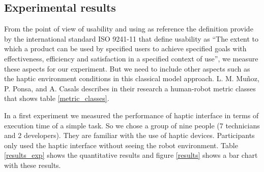 \documentclass[journal,twoside]{JoPhA}
\begin{document}
\subsection{Experimental results}

From the point of view of usability and using as reference the definition provide by the international standard ISO 9241-11 \cite{ISO98} that define usability as “The extent to which a product can be used by specified users to achieve specified goals with effectiveness, efficiency and satisfaction in a specified context of use”, we measure these aspects for our experiment. But we need to include other aspects such as the haptic environment conditions in this classical model approach. L. M. Muñoz, P. Ponsa, and A. Casals \cite{Munoz12} describes in their research a human-robot metric classes that shows table \ref{metric_classes}.

\begin{table}[h]
\centering
\caption{\label{metric_classes}Human-Robot metric classes}
\end{table}

In a first experiment we measured the performance of haptic interface in terms of execution time of a simple task. So we chose a group of nine people (7 technicians and 2 developers). They are familiar with the use of haptic devices. Participants only used the haptic interface without seeing the robot environment. Table \ref{results_exp} shows the quantitative results and figure \ref{results} shows a bar chart with these results. 
\end{document}
